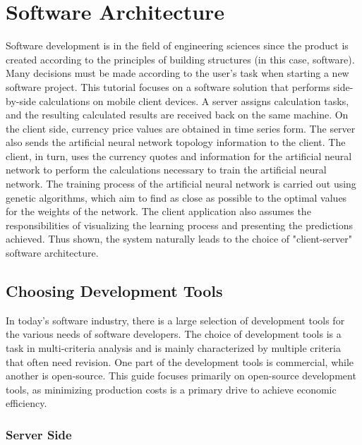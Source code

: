 \newpage
\chapter{Software Architecture}
\label{chapter03}

Software development is in the field of engineering sciences since the product is created according to the principles of building structures (in this case, software). Many decisions must be made according to the user's task when starting a new software project. This tutorial focuses on a software solution that performs side-by-side calculations on mobile client devices. A server assigns calculation tasks, and the resulting calculated results are received back on the same machine. On the client side, currency price values are obtained in time series form. The server also sends the artificial neural network topology information to the client. The client, in turn, uses the currency quotes and information for the artificial neural network to perform the calculations necessary to train the artificial neural network. The training process of the artificial neural network is carried out using genetic algorithms, which aim to find as close as possible to the optimal values for the weights of the network. The client application also assumes the responsibilities of visualizing the learning process and presenting the predictions achieved. Thus shown, the system naturally leads to the choice of "client-server" software architecture.

\section{Choosing Development Tools}

In today's software industry, there is a large selection of development tools for the various needs of software developers. The choice of development tools is a task in multi-criteria analysis and is mainly characterized by multiple criteria that often need revision. One part of the development tools is commercial, while another is open-source. This guide focuses primarily on open-source development tools, as minimizing production costs is a primary drive to achieve economic efficiency.

\subsection{Server Side}

